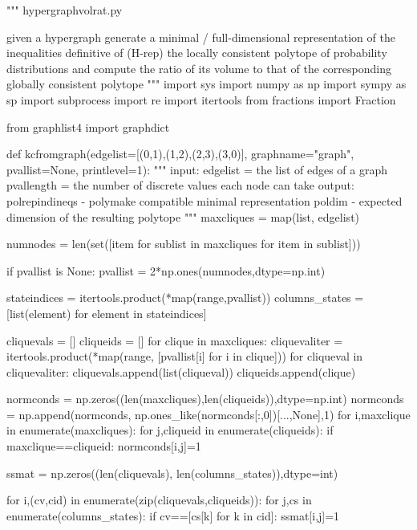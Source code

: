 \begin{python}
"""
hypergraphvolrat.py

given a hypergraph generate a minimal / full-dimensional representation
of the inequalities definitive of (H-rep) the locally consistent
polytope of probability distributions and compute the ratio of its
volume to that of the corresponding globally consistent polytope
"""
import sys
import numpy as np
import sympy as sp
import subprocess
import re
import itertools
from fractions import Fraction

from graphlist4 import graphdict

def kcfromgraph(edgelist=[(0,1),(1,2),(2,3),(3,0)],
                graphname="graph", pvallist=None,
                printlevel=1):
    """
    input: edgelist = the list of edges of a graph
           pvallength = the number of discrete values each node can take
    output: polrepindineqs - polymake compatible minimal
                              representation
            poldim - expected dimension of the resulting polytope
    """
    maxcliques = map(list, edgelist)

    numnodes = len(set([item for sublist in maxcliques for item in sublist]))

    if pvallist is None:
        pvallist = 2*np.ones(numnodes,dtype=np.int)

    stateindices = itertools.product(*map(range,pvallist))
    columns_states = [list(element) for element in stateindices]

    cliquevals = []
    cliqueids = []
    for clique in maxcliques:
        cliquevaliter = itertools.product(*map(range,
                                         [pvallist[i] for i in clique]))
        for cliqueval in cliquevaliter:
            cliquevals.append(list(cliqueval))
            cliqueids.append(clique)

    normconds = np.zeros((len(maxcliques),len(cliqueids)),dtype=np.int)
    normconds = np.append(normconds, np.ones_like(normconds[:,0])[...,None],1)
    for i,maxclique in enumerate(maxcliques):
        for j,cliqueid in enumerate(cliqueids):
            if maxclique==cliqueid:
                normconds[i,j]=1

    ssmat = np.zeros((len(cliquevals),
                      len(columns_states)),dtype=int)

    for i,(cv,cid) in enumerate(zip(cliquevals,cliqueids)):
        for j,cs in enumerate(columns_states):
            if cv==[cs[k] for k in cid]:
                ssmat[i,j]=1


\end{python}
